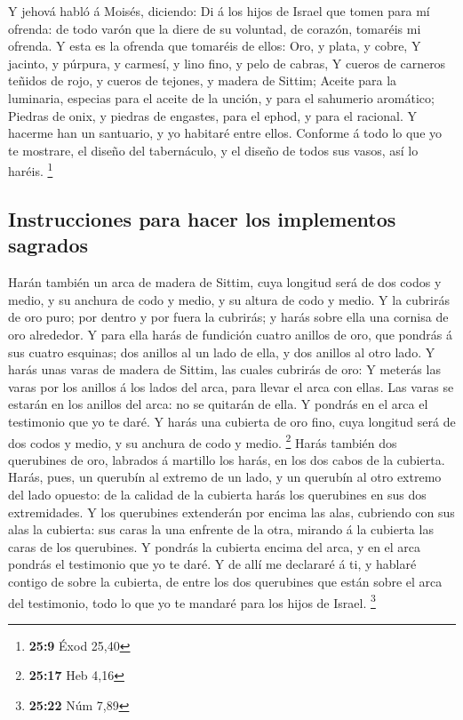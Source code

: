  Y jehová habló á Moisés, diciendo:  Di á los
hijos de Israel que tomen para mí ofrenda: de todo varón que la diere de
su voluntad, de corazón, tomaréis mi ofrenda.  Y esta es la
ofrenda que tomaréis de ellos: Oro, y plata, y cobre,  Y
jacinto, y púrpura, y carmesí, y lino fino, y pelo de cabras,
 Y cueros de carneros teñidos de rojo, y cueros de tejones,
y madera de Sittim;  Aceite para la luminaria, especias para
el aceite de la unción, y para el sahumerio aromático; 
Piedras de onix, y piedras de engastes, para el ephod, y para el
racional.  Y hacerme han un santuario, y yo habitaré entre
ellos.  Conforme á todo lo que yo te mostrare, el diseño del
tabernáculo, y el diseño de todos sus vasos, así lo haréis. \footnote{\textbf{25:9}
  Éxod 25,40}

\hypertarget{instrucciones-para-hacer-los-implementos-sagrados}{%
\subsection{Instrucciones para hacer los implementos
sagrados}\label{instrucciones-para-hacer-los-implementos-sagrados}}

 Harán también un arca de madera de Sittim, cuya longitud
será de dos codos y medio, y su anchura de codo y medio, y su altura de
codo y medio.  Y la cubrirás de oro puro; por dentro y por
fuera la cubrirás; y harás sobre ella una cornisa de oro alrededor.
 Y para ella harás de fundición cuatro anillos de oro, que
pondrás á sus cuatro esquinas; dos anillos al un lado de ella, y dos
anillos al otro lado.  Y harás unas varas de madera de
Sittim, las cuales cubrirás de oro:  Y meterás las varas
por los anillos á los lados del arca, para llevar el arca con ellas.
 Las varas se estarán en los anillos del arca: no se
quitarán de ella.  Y pondrás en el arca el testimonio que
yo te daré.  Y harás una cubierta de oro fino, cuya
longitud será de dos codos y medio, y su anchura de codo y medio.
\footnote{\textbf{25:17} Heb 4,16}  Harás también dos
querubines de oro, labrados á martillo los harás, en los dos cabos de la
cubierta.  Harás, pues, un querubín al extremo de un lado,
y un querubín al otro extremo del lado opuesto: de la calidad de la
cubierta harás los querubines en sus dos extremidades.  Y
los querubines extenderán por encima las alas, cubriendo con sus alas la
cubierta: sus caras la una enfrente de la otra, mirando á la cubierta
las caras de los querubines.  Y pondrás la cubierta encima
del arca, y en el arca pondrás el testimonio que yo te daré.
 Y de allí me declararé á ti, y hablaré contigo de sobre la
cubierta, de entre los dos querubines que están sobre el arca del
testimonio, todo lo que yo te mandaré para los hijos de Israel.
\footnote{\textbf{25:22} Núm 7,89}

